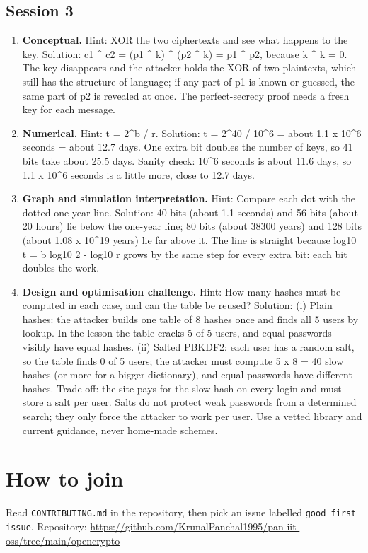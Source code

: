 \documentclass[11pt,a4paper]{article}
\begin{document}
\subsection*{Session 3}
\begin{enumerate}[nosep]
\item \textbf{Conceptual.} Hint: XOR the two ciphertexts and see what happens to the key. Solution: c1 \textasciicircum{} c2 = (p1 \textasciicircum{} k) \textasciicircum{} (p2 \textasciicircum{} k) = p1 \textasciicircum{} p2, because k \textasciicircum{} k = 0. The key disappears and the attacker holds the XOR of two plaintexts, which still has the structure of language; if any part of p1 is known or guessed, the same part of p2 is revealed at once. The perfect-secrecy proof needs a fresh key for each message.
\item \textbf{Numerical.} Hint: t = 2\textasciicircum{}b / r. Solution: t = 2\textasciicircum{}40 / 10\textasciicircum{}6 = about 1.1 x 10\textasciicircum{}6 seconds = about 12.7 days. One extra bit doubles the number of keys, so 41 bits take about 25.5 days. Sanity check: 10\textasciicircum{}6 seconds is about 11.6 days, so 1.1 x 10\textasciicircum{}6 seconds is a little more, close to 12.7 days.
\item \textbf{Graph and simulation interpretation.} Hint: Compare each dot with the dotted one-year line. Solution: 40 bits (about 1.1 seconds) and 56 bits (about 20 hours) lie below the one-year line; 80 bits (about 38300 years) and 128 bits (about 1.08 x 10\textasciicircum{}19 years) lie far above it. The line is straight because log10 t = b log10 2 - log10 r grows by the same step for every extra bit: each bit doubles the work.
\item \textbf{Design and optimisation challenge.} Hint: How many hashes must be computed in each case, and can the table be reused? Solution: (i) Plain hashes: the attacker builds one table of 8 hashes once and finds all 5 users by lookup. In the lesson the table cracks 5 of 5 users, and equal passwords visibly have equal hashes. (ii) Salted PBKDF2: each user has a random salt, so the table finds 0 of 5 users; the attacker must compute 5 x 8 = 40 slow hashes (or more for a bigger dictionary), and equal passwords have different hashes. Trade-off: the site pays for the slow hash on every login and must store a salt per user. Salts do not protect weak passwords from a determined search; they only force the attacker to work per user. Use a vetted library and current guidance, never home-made schemes.
\end{enumerate}

\section{How to join}
Read \texttt{CONTRIBUTING.md} in the repository, then pick an issue labelled \texttt{good first issue}. Repository: \url{https://github.com/KrunalPanchal1995/pan-iit-oss/tree/main/opencrypto}
\end{document}
